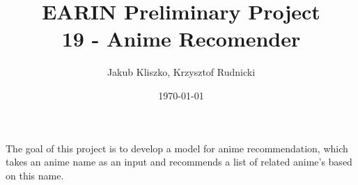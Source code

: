 \documentclass[12pt]{article}
\title{EARIN Preliminary Project \\ 
19 - Anime Recomender}
\author{Jakub Kliszko, Krzysztof Rudnicki }
\date{\today}
\begin{document}
\maketitle

The goal of this project is to develop a model for anime recommendation, which takes an anime name as an input and recommends a list of related anime's based on this name.  \\ 


	
	
	
	
	
\end{document}
